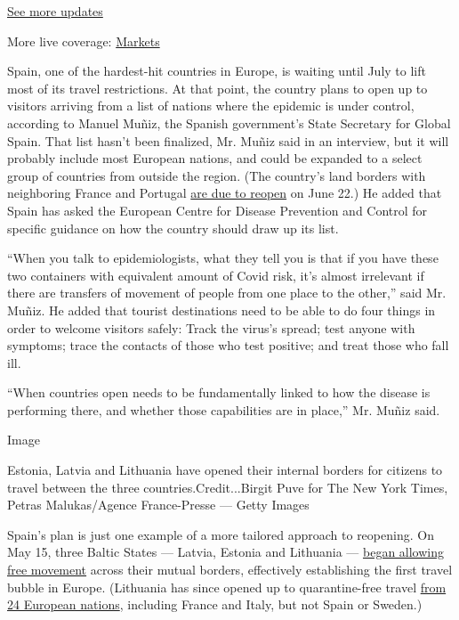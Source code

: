 \href{https://www.nytimes3xbfgragh.onion/2020/08/20/world/coronavirus-covid.html?action=click\&pgtype=Article\&state=default\&region=MAIN_CONTENT_1\&context=storylines_live_updates}{See
more updates}

More live coverage:
\href{https://www.nytimes3xbfgragh.onion/live/2020/08/20/business/stock-market-today-coronavirus?action=click\&pgtype=Article\&state=default\&region=MAIN_CONTENT_1\&context=storylines_live_updates}{Markets}

Spain, one of the hardest-hit countries in Europe, is waiting until July
to lift most of its travel restrictions. At that point, the country
plans to open up to visitors arriving from a list of nations where the
epidemic is under control, according to Manuel Muñiz, the Spanish
government's State Secretary for Global Spain. That list hasn't been
finalized, Mr. Muñiz said in an interview, but it will probably include
most European nations, and could be expanded to a select group of
countries from outside the region. (The country's land borders with
neighboring France and Portugal
\href{https://english.elpais.com/society/2020-06-04/spain-to-open-land-borders-with-portugal-and-france-from-june-22.html}{are
due to reopen} on June 22.) He added that Spain has asked the European
Centre for Disease Prevention and Control for specific guidance on how
the country should draw up its list.

``When you talk to epidemiologists, what they tell you is that if you
have these two containers with equivalent amount of Covid risk, it's
almost irrelevant if there are transfers of movement of people from one
place to the other,'' said Mr. Muñiz. He added that tourist destinations
need to be able to do four things in order to welcome visitors safely:
Track the virus's spread; test anyone with symptoms; trace the contacts
of those who test positive; and treat those who fall ill.

``When countries open needs to be fundamentally linked to how the
disease is performing there, and whether those capabilities are in
place,'' Mr. Muñiz said.

Image

Estonia, Latvia and Lithuania have opened their internal borders for
citizens to travel between the three countries.Credit...Birgit Puve for
The New York Times, Petras Malukas/Agence France-Presse --- Getty Images

Spain's plan is just one example of a more tailored approach to
reopening. On May 15, three Baltic States --- Latvia, Estonia and
Lithuania ---
\href{https://www.reuters.com/article/us-health-coronavirus-baltic/baltics-open-europes-first-pandemic-travel-bubble-as-curbs-ease-idUSKBN22Q3KM}{began
allowing free movement} across their mutual borders, effectively
establishing the first travel bubble in Europe. (Lithuania has since
opened up to quarantine-free travel
\href{https://www.schengenvisainfo.com/news/travelers-from-24-european-countries-can-enter-lithuania-without-being-quarantined/}{from
24 European nations}, including France and Italy, but not Spain or
Sweden.)

